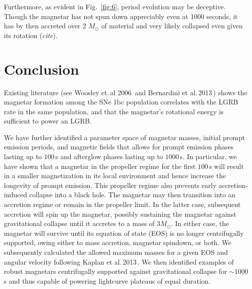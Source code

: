 \documentclass{article}
\begin{document}
Furthermore, as evident in Fig.~\ref{fig:6}, period evolution may be deceptive. Though the magnetar has not spun down appreciably even at 1000 seconds, it has by then accreted over 2 $M_{\odot}$ of material and very likely collapsed even given its rotation (\textit{cite}).

\section{Conclusion}

Existing literature (see Woosley et.\,al 2006\,\cite{Woosley:2006fn} and Bernardini et al.\,2013\,\cite{Bernardini:2013nfa}) shows the magnetar formation among the SNe 1bc population correlates with the LGRB rate in the same population, and that the magnetar's rotational energy is sufficient to power an LGRB.

We have further identified a parameter space of magnetar masses, initial prompt emission periods, and magnetic fields that allows for prompt emission phases lasting up to $100$\,s and afterglow phases lasting up to $1000$\,s. In particular, we have shown that a magnetar in the propeller regime for the first $100$\,s will result in a smaller magnetization in its local environment and hence increase the longevity of prompt emission. This propeller regime also prevents early accretion-induced collapse into a black hole. The magnetar may then transition into an accretion regime or remain in the propeller limit. In the latter case, subsequent accretion will spin up the magnetar, possibly sustaining the magnetar against gravitational collapse until it accretes to a mass of $3M_{\odot}$. In either case, the magnetar will survive until its equation of state (EOS) is no longer centrifugally supported, owing either to mass accretion, magnetar spindown, or both. We subsequently calculated the allowed maximum masses for a given EOS and angular velocity following Kaplan et al.\,2013\,\cite{Kaplan:2013wra}. We then identified examples of robust magnetars centrifugally supported against gravitational collapse for $\sim 1000$\,s and thus capable of powering lightcurve plateaus of equal duration.
\end{document}
